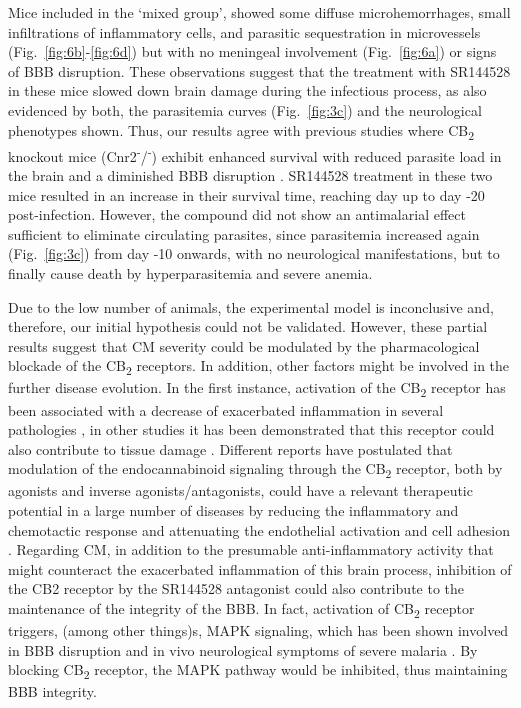 \documentclass[empirical, authordate]{jote-new-article}
\begin{document}
Mice included in the `mixed group', showed some diffuse microhemorrhages, small infiltrations of inflammatory cells, and parasitic sequestration in microvessels (Fig.~\ref{fig:6b}-\ref{fig:6d}) but with no meningeal involvement (Fig.~\ref{fig:6a}) or signs of BBB disruption. These observations suggest that the treatment with SR144528 in these mice slowed down brain damage during the infectious process, as also evidenced by both, the parasitemia curves (Fig.~\ref{fig:3c}) and the neurological phenotypes shown. Thus, our results agree with previous studies where CB\textsubscript{2} knockout mice (Cnr2\textsuperscript{-}/\textsuperscript{-}) exhibit enhanced survival with reduced parasite load in the brain and a diminished BBB disruption \parencite{Alferink2016}. SR144528 treatment in these two mice resulted in an increase in their survival time, reaching day up to day -20 post-infection. However, the compound did not show an antimalarial effect sufficient to eliminate circulating parasites, since parasitemia increased again (Fig.~\ref{fig:3c}) from day -10 onwards, with no neurological manifestations, but to finally cause death by hyperparasitemia and severe anemia.



Due to the low number of animals, the experimental model is inconclusive and, therefore, our initial hypothesis could not be validated. However, these partial results suggest that CM severity could be modulated by the pharmacological blockade of the CB\textsubscript{2} receptors. In addition, other factors might be involved in the further disease evolution. In the first instance, activation of the CB\textsubscript{2} receptor has been associated with a decrease of exacerbated inflammation in several pathologies \parencite{Morales2016, Turcotte2016, Fernández-Ruiz2006, Fernández-Ruiz2015}, in other studies it has been demonstrated that this receptor could also contribute to tissue damage \parencite{Pacher2011}. Different reports have postulated that modulation of the endocannabinoid signaling through the CB\textsubscript{2} receptor, both by agonists and inverse agonists/antagonists, could have a relevant therapeutic potential in a large number of diseases by reducing the inflammatory and chemotactic response and attenuating the endothelial activation and cell adhesion \parencite{Pacher2011}. Regarding CM, in addition to the presumable anti-inflammatory activity that might counteract the exacerbated inflammation of this brain process, inhibition of the CB2 receptor by the SR144528 antagonist could also contribute to the maintenance of the integrity of the BBB. In fact, activation of CB\textsubscript{2} receptor triggers, (among other things)s, MAPK signaling, which has been shown involved in BBB disruption and in vivo neurological symptoms of severe malaria \parencite{Picone2015, Rhee2002}. By blocking CB\textsubscript{2} receptor, the MAPK pathway would be inhibited, thus maintaining BBB integrity.
\end{document}
